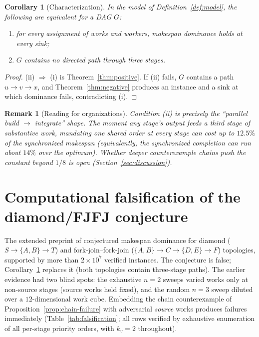 \documentclass[sn-mathphys,NameDate]{sn-jnl}
\theoremstyle{thmstyleone}
\newtheorem{corollary}[theorem]{Corollary}
\theoremstyle{thmstylethree}
\theoremstyle{thmstyletwo}
\newtheorem{remark}[theorem]{Remark}
\begin{document}
\begin{corollary}[Characterization]
\label{cor:characterization}
In the model of Definition~\ref{def:model}, the following are
equivalent for a DAG $G$:
\begin{enumerate}
\item[\textup{(i)}] for every assignment of works and workers,
  makespan dominance holds at every sink;
\item[\textup{(ii)}] $G$ contains no directed path through
  three stages.
\end{enumerate}
\end{corollary}

\begin{proof}
(ii) $\Rightarrow$ (i) is Theorem~\ref{thm:positive}. If (ii)
fails, $G$ contains a path $u \to v \to x$, and
Theorem~\ref{thm:negative} produces an instance and a sink at
which dominance fails, contradicting (i).
\end{proof}

\begin{remark}[Reading for organizations]
\label{rem:org}
Condition (ii) is precisely the ``parallel build $\to$
integrate'' shape. The moment any stage's output feeds a third
stage of substantive work, mandating one shared order at every
stage can cost up to $12.5\%$ of the synchronized makespan
(equivalently, the synchronized completion can run about
$14\%$ over the optimum). Whether deeper counterexample chains
push the constant beyond $1/8$ is open
(Section~\ref{sec:discussion}).
\end{remark}

\section{Computational falsification of the diamond/FJFJ
conjecture}
\label{sec:falsification}

The extended preprint of \citet{bowmanA} conjectured makespan
dominance for diamond
($S \to \{A, B\} \to T$) and fork-join--fork-join
($\{A,B\} \to C \to \{D,E\} \to F$) topologies, supported by
more than $2 \times 10^7$ verified instances. The conjecture
is false; Corollary~\ref{cor:characterization} replaces it
(both topologies contain three-stage paths). The earlier
evidence had two blind spots: the exhaustive $n = 2$ sweeps
varied works only at non-source stages (source works held
fixed), and the random $n = 3$ sweep diluted over a
$12$-dimensional work cube. Embedding the chain counterexample
of Proposition~\ref{prop:chain-failure} with adversarial
\emph{source} works produces failures immediately
(Table~\ref{tab:falsification}; all rows verified by
exhaustive enumeration of all per-stage priority orders, with
$k_v = 2$ throughout).
\end{document}
